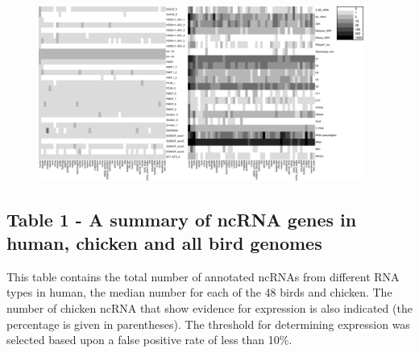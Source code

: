 \documentclass[10pt]{bmc_article}
\newenvironment{bmcformat}{\begin{raggedright}\baselineskip20pt\sloppy\setboolean{publ}{false}}{\end{raggedright}\baselineskip20pt\sloppy}
\begin{document}
\begin{bmcformat}
 \begin{figure}[ht]
   \centering
   \includegraphics[width=0.95\textwidth]{figures/figure1.pdf}
 \end{figure}


\clearpage
\newpage

  \subsection*{Table 1 - A summary of ncRNA genes in human, chicken and all bird genomes}

This table contains the total number of annotated ncRNAs from
different RNA types in human, the median number for each of the 48
birds and chicken. The number of chicken ncRNA that show evidence for
expression is also indicated (the percentage is given in parentheses).
The threshold for determining expression was selected based upon a
false positive rate of less than 10\%.\label{table:1}


\end{bmcformat}
\end{document}
